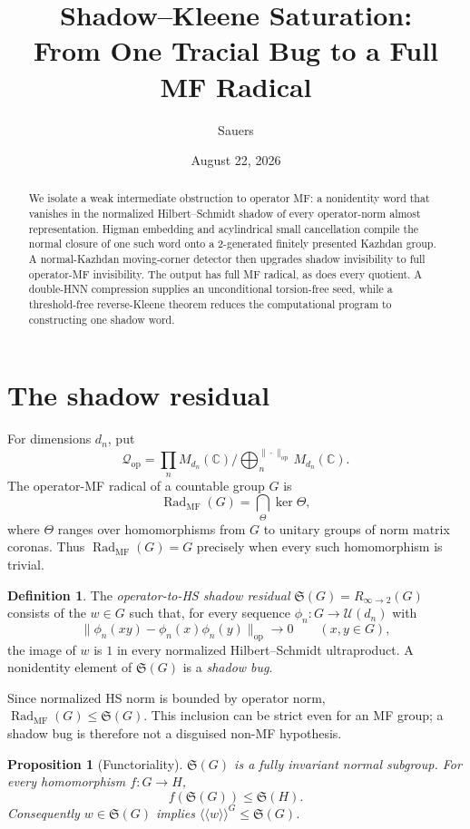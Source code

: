 \documentclass[10pt]{amsart}
\title[Shadow--Kleene saturation]{Shadow--Kleene Saturation:\\
  From One Tracial Bug to a Full MF Radical}
\author{Sauers}
\date{August 22, 2026}
\newtheorem{proposition}[theorem]{Proposition}
\theoremstyle{definition}
\newtheorem{definition}[theorem]{Definition}
\theoremstyle{remark}
\newcommand{\C}{\mathbb C}
\newcommand{\U}{\mathcal U}
\newcommand{\Shadow}{\mathfrak S}
\newcommand{\MFRad}{\operatorname{Rad}_{\mathrm{MF}}}
\newcommand{\Normal}[1]{\langle\!\langle #1\rangle\!\rangle}
\begin{document}
\begin{abstract}
We isolate a weak intermediate obstruction to operator MF: a nonidentity
word that vanishes in the normalized Hilbert--Schmidt shadow of every
operator-norm almost representation.  Higman embedding and acylindrical
small cancellation compile the normal closure of one such word onto a
2-generated finitely presented Kazhdan group.  A normal-Kazhdan moving-corner
detector then upgrades shadow invisibility to full operator-MF invisibility.
The output has full MF radical, as does every quotient.  A double-HNN
compression supplies an unconditional torsion-free seed, while a
threshold-free reverse-Kleene theorem reduces the computational program to
constructing one shadow word.
\end{abstract}

\maketitle

\section{The shadow residual}

For dimensions $d_n$, put
\[
 \mathcal Q_{\mathrm{op}}
 =\prod_nM_{d_n}(\C)\big/
   \bigoplus_n^{\|\cdot\|_{\mathrm{op}}}M_{d_n}(\C).
\]
The operator-MF radical of a countable group $G$ is
\[
 \MFRad(G)=\bigcap_\Theta\ker\Theta,
\]
where $\Theta$ ranges over homomorphisms from $G$ to unitary groups of norm
matrix coronas.  Thus $\MFRad(G)=G$ precisely when every such homomorphism is
trivial.

\begin{definition}
The \emph{operator-to-HS shadow residual} $\Shadow(G)=R_{\infty\to2}(G)$
consists of the $w\in G$ such that, for every sequence
$\phi_n:G\to\U(d_n)$ with
\[
 \|\phi_n(xy)-\phi_n(x)\phi_n(y)\|_{\mathrm{op}}\longrightarrow0
 \qquad(x,y\in G),
\]
the image of $w$ is $1$ in every normalized Hilbert--Schmidt ultraproduct.
A nonidentity element of $\Shadow(G)$ is a \emph{shadow bug}.
\end{definition}

Since normalized HS norm is bounded by operator norm,
$\MFRad(G)\leq\Shadow(G)$.  This inclusion can be strict even for an MF
group; a shadow bug is therefore not a disguised non-MF hypothesis.

\begin{proposition}[Functoriality]
$\Shadow(G)$ is a fully invariant normal subgroup.  For every homomorphism
$f:G\to H$,
\[
 f(\Shadow(G))\leq\Shadow(H).
\]
Consequently $w\in\Shadow(G)$ implies
$\Normal{w}^{G}\leq\Shadow(G)$.
\end{proposition}
\end{document}
